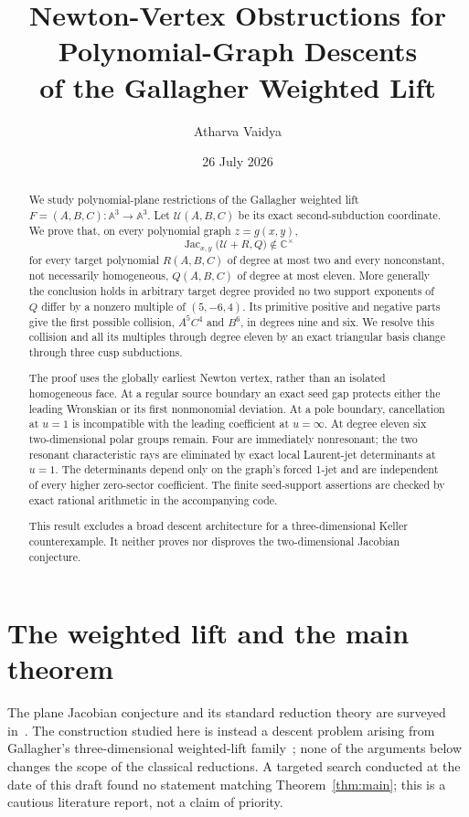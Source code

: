\documentclass[11pt]{article}
\title{Newton-Vertex Obstructions for Polynomial-Graph Descents\\
of the Gallagher Weighted Lift}
\author{Atharva Vaidya}
\date{26 July 2026}
\theoremstyle{remark}
\newcommand{\A}{\mathbb A}
\newcommand{\C}{\mathbb C}
\newcommand{\Jac}{\operatorname{Jac}}
\newcommand{\cU}{\mathcal U}
\begin{document}
\maketitle

\begin{abstract}
We study polynomial-plane restrictions of the Gallagher weighted lift
\(F=(A,B,C):\A^3\to\A^3\).  Let \(\cU(A,B,C)\) be its exact
second-subduction coordinate.  We prove that, on every polynomial graph
\(z=g(x,y)\),
\[
 \Jac_{x,y}\bigl(\cU+R,Q\bigr)\notin\C^\times
\]
for every target polynomial \(R(A,B,C)\) of degree at most two and every
nonconstant, not necessarily homogeneous, \(Q(A,B,C)\) of degree at most
eleven.  More generally the conclusion holds in arbitrary target degree
provided no two support exponents of \(Q\) differ by a nonzero multiple of
\((5,-6,4)\).  Its primitive positive and negative parts give the first
possible collision, \(A^5C^4\) and \(B^6\), in degrees nine and six.
We resolve this collision and all its multiples through degree eleven by an
exact triangular basis change through three cusp subductions.

The proof uses the globally earliest Newton vertex, rather than an
isolated homogeneous face.  At a regular source boundary an exact
seed gap protects either the leading Wronskian or its first
nonmonomial deviation.  At a pole boundary, cancellation at
\(u=1\) is incompatible with the leading coefficient at
\(u=\infty\).  At degree eleven six two-dimensional polar groups remain.
Four are immediately nonresonant; the two resonant characteristic rays
are eliminated by exact local Laurent-jet determinants at \(u=1\).
The determinants depend only on the graph's forced 1-jet and are
independent of every higher zero-sector coefficient.  The finite
seed-support assertions are checked by exact rational arithmetic in the
accompanying code.

This result excludes a broad descent architecture for a
three-dimensional Keller counterexample.  It neither proves nor
disproves the two-dimensional Jacobian conjecture.
\end{abstract}

\section{The weighted lift and the main theorem}

The plane Jacobian conjecture and its standard reduction theory are
surveyed in~\cite{BassConnellWright,vanDenEssen}.  The construction
studied here is instead a descent problem arising from Gallagher's
three-dimensional weighted-lift family~\cite{Gallagher}; none of the
arguments below changes the scope of the classical reductions.  A
targeted search conducted at the date of this draft found no statement
matching Theorem~\ref{thm:main}; this is a cautious literature report,
not a claim of priority.
\end{document}
